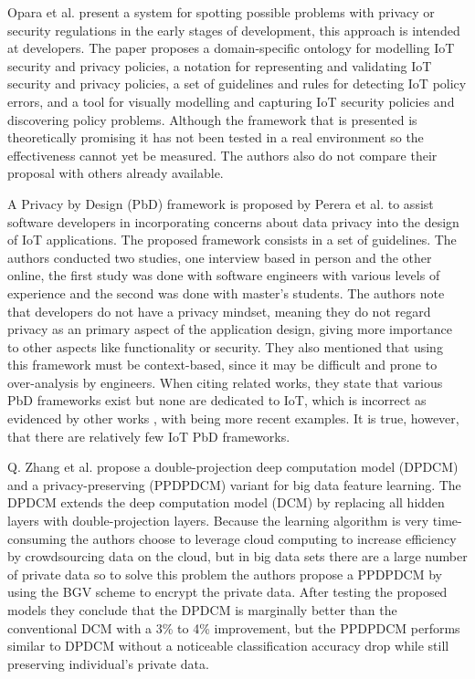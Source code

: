 Opara et al. \cite{opara2022framework} present a system for spotting possible
problems with privacy or security regulations in the early stages of development,
this approach is intended at developers. The paper proposes a domain-specific
ontology for modelling IoT security and privacy policies, a notation for
representing and validating IoT security and privacy policies, a set of
guidelines and rules for detecting IoT policy errors, and a tool for visually
modelling and capturing IoT security policies and discovering policy problems.
Although the framework that is presented is theoretically promising it has
not been tested in a real environment so the effectiveness cannot yet be
measured. The authors also do not compare their proposal with others already
available.

A Privacy by Design (PbD) framework is proposed by Perera et al. \cite{perera2020designing}
to assist software developers in incorporating concerns about data privacy
into the design of IoT applications. The proposed framework consists in
a set of guidelines. The authors conducted two studies, one interview based
in person and the other online, the first study was done with software engineers with
various levels of experience and the second was done with master's students.
The authors note that developers do not have a privacy mindset, meaning
they do not regard privacy as an primary aspect of the application design,
giving more importance to other aspects like functionality or security.
They also mentioned that using this framework must be context-based, since
it may be difficult and prone to over-analysis by engineers. When citing
related works, they state that various PbD frameworks exist but none are dedicated
to IoT, which is incorrect as evidenced by other works \cite{o2017privacy, cavoukian2016embedding},
with \cite{alkhariji2023semantics, aljeraisy2021privacy} being more recent
examples. It is true, however, that there are relatively few IoT PbD frameworks.

Q. Zhang et al. \cite{zhang2017privacy} propose a double-projection deep
computation model (DPDCM) and a privacy-preserving (PPDPDCM) variant for
big data feature learning. The DPDCM extends the deep computation model
(DCM) by replacing all hidden layers with double-projection layers.
Because the learning algorithm is very time-consuming the authors choose
to leverage cloud computing to increase efficiency by crowdsourcing data
on the cloud, but in big data sets there are a large number of private data
so to solve this problem the authors propose a PPDPDCM by using the BGV
scheme to encrypt the private data. After testing the proposed models
they conclude that the DPDCM is marginally better than the conventional DCM
with a 3\% to 4\% improvement, but the PPDPDCM performs similar to DPDCM
without a noticeable classification accuracy drop while still preserving
individual's private data.

